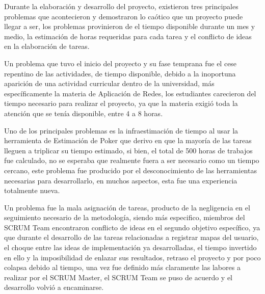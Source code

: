 Durante la elaboración y desarrollo del proyecto, existieron tres principales problemas que acontecieron y demostraron lo caótico que un proyecto puede llegar a ser, los problemas provinieron de el tiempo disponible durante un mes y medio, la estimación de horas requeridas para cada tarea y el conflicto de ideas en la elaboración de tareas.

Un problema que tuvo el inicio del proyecto y su fase temprana fue el cese repentino de las actividades, de tiempo disponible, debido a la inoportuna aparición de una actividad curricular dentro de la universidad, más específicamente la materia de Aplicación de Redes, los estudiantes carecieron del tiempo necesario para realizar el proyecto, ya que la materia exigió toda la atención que se tenía disponible, entre 4 a 8 horas.

Uno de los principales problemas es la infraestimación de tiempo al usar la herramienta de Estimación de Poker que derivo en que la mayoría de las tareas lleguen a triplicar su tiempo estimado, si bien, el  total de 500 horas de trabajos fue calculado, no se esperaba que realmente fuera a ser necesario como un tiempo cercano, este problema fue producido por el desconocimiento de las herramientas necesarias para desarrollarlo, en muchos aspectos, esta fue una experiencia totalmente nueva.

Un problema fue la mala asignación de tareas, producto de la negligencia en el seguimiento necesario de la metodología, siendo más especifico, miembros del SCRUM Team encontraron conflicto de ideas en el segundo objetivo específico, ya que durante el desarrollo de las tareas relacionadas a registrar mapas del usuario, el choque entre las ideas de implementación ya desarrolladas, el tiempo invertido en ello y la imposibilidad de enlazar sus resultados, retraso el proyecto y por poco colapsa debido al tiempo, una vez fue definido más claramente las labores a realizar por el SCRUM Master, el SCRUM Team se puso de acuerdo y el desarrollo volvió a encaminarse.

